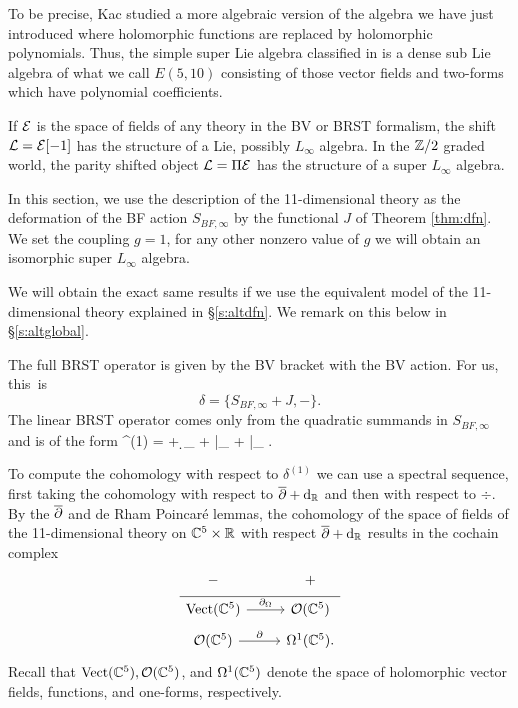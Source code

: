 To be precise, Kac studied a more algebraic version of the algebra we have just introduced where holomorphic functions are replaced by holomorphic polynomials.
Thus, the simple super Lie algebra classified in \cite{KacBible} is a dense sub Lie algebra of what we call $E(5,10)$ consisting of those vector fields and two-forms which have polynomial coefficients.

\parsec[]

If $\mathcal E$ is the space of fields of any theory in the BV or BRST formalism, the shift $\mathcal L = \mathcal E[-1]$ has the structure of a Lie, possibly $L_\infty$ algebra. 
In the $\mathbb Z/2$ graded world, the parity shifted object $\mathcal L = \Pi \mathcal E$ has the structure of a super $L_\infty$ algebra. 

In this section, we use the description of the 11-dimensional theory as the deformation of the BF action $S_{BF,\infty}$ by the functional $J$ of Theorem \ref{thm:dfn}. 
We set the coupling $g = 1$, for any other nonzero value of $g$ we will obtain an isomorphic super $L_\infty$ algebra.

We will obtain the exact same results if we use the equivalent model of the 11-dimensional theory explained in \S \ref{s:altdfn}. 
We remark on this below in \S \ref{s:altglobal}. 

The full BRST operator is given by the BV bracket with the BV action. 
For us, this~is 
\[
\delta = \{S_{BF,\infty} + J, -\} .
\]
The linear BRST operator comes only from the quadratic summands in $S_{BF,\infty}$ and is of the form
\beqn\label{eqn:linearBRST}
\delta^{(1)} = \dbar + \d_{\RR} + \div |_{\mu \to \nu} + \del |_{\beta \to \gamma} .
\eeqn

To compute the cohomology with respect to $\delta^{(1)}$ we can use a spectral sequence, first taking the cohomology with respect to $\overline{\partial} + {\rm d}_{\mathbb R}$ and then with respect to $\div$. 
By the $\overline{\partial}$ and de Rham Poincar\'e lemmas, the cohomology of the space of fields of the 11-dimensional theory on $\mathbb C^5 \times \mathbb R$ with respect $\overline{\partial} + {\rm d}_{\mathbb R}$ results in the cochain complex
\begin{equation}
  \label{eq:lin1} 
  \begin{tikzcd}[row sep = 1 ex]
    - & + \\ \hline
    \Vect(\CC^5) \ar[r, "\div"] & \cO(\CC^5) \\ 
     \cO(\CC^5) \ar[r, "\del"] & \Omega^{1}(\CC^5).
\end{tikzcd}
\end{equation}
Recall that ${\rm Vect}(\mathbb C^5), \mathcal O(\mathbb C^5)$, and $\Omega^1(\mathbb C^5)$ denote the space of holomorphic vector fields, functions, and one-forms, respectively.


